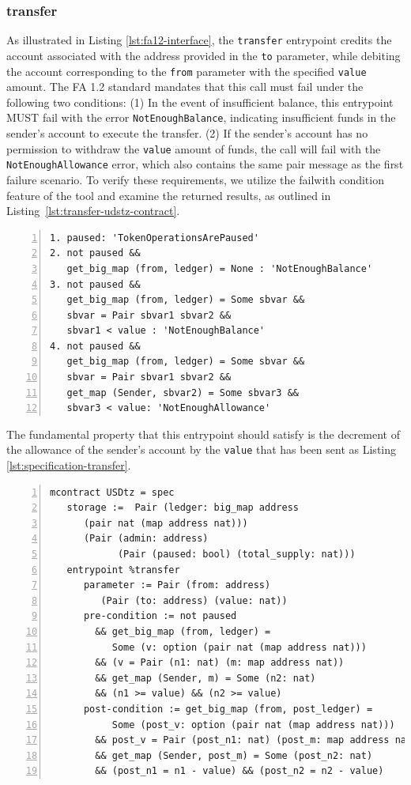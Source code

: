 \documentclass[a4paper,USenglish,cleveref, autoref, thm-restate]{lipics-v2021}
\begin{document}
\subsubsection{transfer}
As illustrated in Listing \ref{lst:fa12-interface}, the
\lstinline/transfer/ entrypoint credits the account associated with
the address provided in the \lstinline/to/ parameter, while debiting
the account corresponding to the \lstinline/from/ parameter with the
specified \lstinline/value/ amount. The FA 1.2 standard mandates that
this call must fail under the following two conditions: (1) In the
event of insufficient balance, this entrypoint MUST fail with the
error \lstinline/NotEnoughBalance/, indicating insufficient funds in
the sender's account to execute the transfer. (2) If the sender's
account has no permission to withdraw the \lstinline/value/ amount of
funds, the call will fail with the \lstinline/NotEnoughAllowance/
error, which also contains the same pair message as the first failure
scenario. To verify these requirements, we utilize the failwith
condition feature of the tool and examine the returned results, as
outlined in Listing~\ref{lst:transfer-udstz-contract}.
\begin{lstlisting}[float,captionpos=b,caption={Fail conditions for the \lstinline/transfer/ entrypoint},label={lst:transfer-udstz-contract},numbers=left]
1. paused: 'TokenOperationsArePaused'
2. not paused &&
   get_big_map (from, ledger) = None : 'NotEnoughBalance'
3. not paused &&
   get_big_map (from, ledger) = Some sbvar &&
   sbvar = Pair sbvar1 sbvar2 &&
   sbvar1 < value : 'NotEnoughBalance'
4. not paused &&
   get_big_map (from, ledger) = Some sbvar &&
   sbvar = Pair sbvar1 sbvar2 &&
   get_map (Sender, sbvar2) = Some sbvar3 &&
   sbvar3 < value: 'NotEnoughAllowance'
\end{lstlisting}
The fundamental property that this entrypoint should satisfy is the decrement of the allowance of the sender's account by the \lstinline/value/ that has been sent as Listing \ref{lst:specification-transfer}.
\begin{lstlisting}[float,captionpos=b,caption={Specification of the \lstinline/transfer/ entrypoint},label={lst:specification-transfer},numbers=left]
mcontract USDtz = spec 
   storage :=  Pair (ledger: big_map address 
      (pair nat (map address nat))) 
      (Pair (admin: address) 
            (Pair (paused: bool) (total_supply: nat)))
   entrypoint %transfer
      parameter := Pair (from: address)
         (Pair (to: address) (value: nat))
      pre-condition := not paused 
        && get_big_map (from, ledger) = 
           Some (v: option (pair nat (map address nat))) 
        && (v = Pair (n1: nat) (m: map address nat))
        && get_map (Sender, m) = Some (n2: nat) 
        && (n1 >= value) && (n2 >= value)
      post-condition := get_big_map (from, post_ledger) = 
           Some (post_v: option (pair nat (map address nat))) 
        && post_v = Pair (post_n1: nat) (post_m: map address nat) 
        && get_map (Sender, post_m) = Some (post_n2: nat) 
        && (post_n1 = n1 - value) && (post_n2 = n2 - value)
\end{lstlisting}
\end{document}
